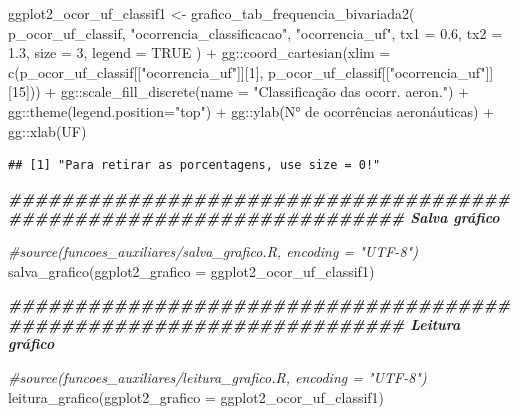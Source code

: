 \documentclass[
]{article}
\newenvironment{Shaded}{\begin{snugshade}}{\end{snugshade}}
\newcommand{\AttributeTok}[1]{\textcolor[rgb]{0.77,0.63,0.00}{#1}}
\newcommand{\CommentTok}[1]{\textcolor[rgb]{0.56,0.35,0.01}{\textit{#1}}}
\newcommand{\ConstantTok}[1]{\textcolor[rgb]{0.00,0.00,0.00}{#1}}
\newcommand{\DecValTok}[1]{\textcolor[rgb]{0.00,0.00,0.81}{#1}}
\newcommand{\DocumentationTok}[1]{\textcolor[rgb]{0.56,0.35,0.01}{\textbf{\textit{#1}}}}
\newcommand{\FloatTok}[1]{\textcolor[rgb]{0.00,0.00,0.81}{#1}}
\newcommand{\FunctionTok}[1]{\textcolor[rgb]{0.00,0.00,0.00}{#1}}
\newcommand{\NormalTok}[1]{#1}
\newcommand{\OtherTok}[1]{\textcolor[rgb]{0.56,0.35,0.01}{#1}}
\newcommand{\SpecialCharTok}[1]{\textcolor[rgb]{0.00,0.00,0.00}{#1}}
\newcommand{\StringTok}[1]{\textcolor[rgb]{0.31,0.60,0.02}{#1}}
\begin{document}
\begin{Shaded}
\begin{Highlighting}[]
\NormalTok{ggplot2\_ocor\_uf\_classif1 }\OtherTok{\textless{}{-}} \FunctionTok{grafico\_tab\_frequencia\_bivariada2}\NormalTok{(}
\NormalTok{    p\_ocor\_uf\_classif,}
    \StringTok{"ocorrencia\_classificacao"}\NormalTok{,}
    \StringTok{"ocorrencia\_uf"}\NormalTok{,}
    \AttributeTok{tx1 =} \FloatTok{0.6}\NormalTok{,}
    \AttributeTok{tx2 =} \FloatTok{1.3}\NormalTok{,}
    \AttributeTok{size =} \DecValTok{3}\NormalTok{,}
    \AttributeTok{legend =} \ConstantTok{TRUE}
\NormalTok{) }\SpecialCharTok{+}\NormalTok{ gg}\SpecialCharTok{::}\FunctionTok{coord\_cartesian}\NormalTok{(}\AttributeTok{xlim =} \FunctionTok{c}\NormalTok{(p\_ocor\_uf\_classif[[}\StringTok{"ocorrencia\_uf"}\NormalTok{]][}\DecValTok{1}\NormalTok{],}
\NormalTok{                        p\_ocor\_uf\_classif[[}\StringTok{"ocorrencia\_uf"}\NormalTok{]][}\DecValTok{15}\NormalTok{])) }\SpecialCharTok{+}
\NormalTok{    gg}\SpecialCharTok{::}\FunctionTok{scale\_fill\_discrete}\NormalTok{(}\AttributeTok{name =} \StringTok{"Classificação das ocorr. aeron."}\NormalTok{) }\SpecialCharTok{+}
\NormalTok{    gg}\SpecialCharTok{::}\FunctionTok{theme}\NormalTok{(}\AttributeTok{legend.position=}\StringTok{"top"}\NormalTok{) }\SpecialCharTok{+} 
\NormalTok{    gg}\SpecialCharTok{::}\FunctionTok{ylab}\NormalTok{(}\StringTok{\textquotesingle{}N° de ocorrências aeronáuticas\textquotesingle{}}\NormalTok{) }\SpecialCharTok{+}
\NormalTok{    gg}\SpecialCharTok{::}\FunctionTok{xlab}\NormalTok{(}\StringTok{\textquotesingle{}UF\textquotesingle{}}\NormalTok{)}
\end{Highlighting}
\end{Shaded}

\begin{verbatim}
## [1] "Para retirar as porcentagens, use size = 0!"
\end{verbatim}

\begin{Shaded}
\begin{Highlighting}[]
\DocumentationTok{\#\#\#\#\#\#\#\#\#\#\#\#\#\#\#\#\#\#\#\#\#\#\#\#\#\#\#\#\#\#\#\#\#\#\#\#\#\#\#\#\#\#\#\#\#\#\#\#\#\#\#\#\#\#\#\#\#\#\#\#\#\#\#\#\#\#\#\# Salva gráfico}

\CommentTok{\#source(\textquotesingle{}funcoes\_auxiliares/salva\_grafico.R\textquotesingle{}, encoding = "UTF{-}8")}
\FunctionTok{salva\_grafico}\NormalTok{(}\AttributeTok{ggplot2\_grafico =}\NormalTok{ ggplot2\_ocor\_uf\_classif1)}

\DocumentationTok{\#\#\#\#\#\#\#\#\#\#\#\#\#\#\#\#\#\#\#\#\#\#\#\#\#\#\#\#\#\#\#\#\#\#\#\#\#\#\#\#\#\#\#\#\#\#\#\#\#\#\#\#\#\#\#\#\#\#\#\#\#\#\#\#\#\#\#\# Leitura gráfico}

\CommentTok{\#source(\textquotesingle{}funcoes\_auxiliares/leitura\_grafico.R\textquotesingle{}, encoding = "UTF{-}8")}
\FunctionTok{leitura\_grafico}\NormalTok{(}\AttributeTok{ggplot2\_grafico =}\NormalTok{ ggplot2\_ocor\_uf\_classif1)}
\end{Highlighting}
\end{Shaded}
\end{document}
